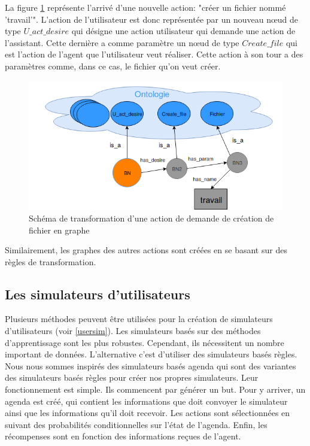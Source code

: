 La figure \ref{nonabstract_onto} représente l'arrivé d'une nouvelle action: "créer un fichier nommé 'travail'". L'action de l'utilisateur est donc représentée par un nouveau n\oe{}ud de type $U\_act\_desire$ qui désigne une action utilisateur qui demande une action de l'assistant. Cette dernière a comme paramètre un n\oe{}ud de type $Create\_file$ qui est l'action de l'agent que l'utilisateur veut réaliser. Cette action à son tour a des paramètres comme, dans ce cas, le fichier qu'on veut créer.
\begin{figure}[H] 
	\centering
	\includegraphics[width=0.88\linewidth]{images/Conception/DM/nonabstract_onto.png}
	\caption{Schéma de transformation d'une action de demande de création de fichier en graphe}\label{nonabstract_onto}
	
\end{figure}
Similairement, les graphes des autres actions sont créées en se basant sur des règles de transformation.
\subsection{Les simulateurs d'utilisateurs}
Plusieurs méthodes peuvent être utilisées pour la création de simulateurs d'utilisateurs (voir \ref{usersim}). Les simulateurs basés sur des méthodes d'apprentissage sont les plus robustes. Cependant, ils nécessitent un nombre important de données. L'alternative c'est d'utiliser des simulateurs basés règles. Nous nous sommes inspirés des simulateurs basés agenda\cite{Schatzmann2007} qui sont des variantes des simulateurs basés règles pour créer nos propres simulateurs. Leur fonctionnement est simple. Ils commencent par générer un but. Pour y arriver, un agenda est créé, qui contient les informations que doit convoyer le simulateur ainsi que les informations qu'il doit recevoir. Les actions sont sélectionnées en suivant des probabilités conditionnelles sur l'état de l'agenda. Enfin, les récompenses sont en fonction des informations reçues de l'agent.
